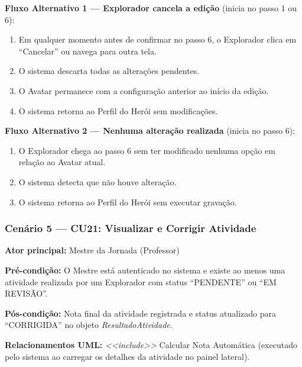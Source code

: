 \documentclass[12pt, a4paper]{article}
\begin{document}
\textbf{Fluxo Alternativo 1 --- Explorador cancela a edição} (inicia no passo 1 ou 6):
\begin{enumerate}
    \item Em qualquer momento antes de confirmar no passo 6, o Explorador clica em ``Cancelar'' ou navega para outra tela.
    \item O sistema descarta todas as alterações pendentes.
    \item O Avatar permanece com a configuração anterior ao início da edição.
    \item O sistema retorna ao Perfil do Herói sem modificações.
\end{enumerate}

\textbf{Fluxo Alternativo 2 --- Nenhuma alteração realizada} (inicia no passo 6):
\begin{enumerate}
    \item O Explorador chega ao passo 6 sem ter modificado nenhuma opção em relação ao Avatar atual.
    \item O sistema detecta que não houve alteração.
    \item O sistema retorna ao Perfil do Herói sem executar gravação.
\end{enumerate}

\bigskip

\subsubsection*{Cenário 5 --- CU21: Visualizar e Corrigir Atividade}

\noindent\textbf{Ator principal:} Mestre da Jornada (Professor)

\noindent\textbf{Pré-condição:} O Mestre está autenticado no sistema e existe ao menos
uma atividade realizada por um Explorador com status ``PENDENTE'' ou ``EM REVISÃO''.

\noindent\textbf{Pós-condição:} Nota final da atividade registrada e status atualizado
para ``CORRIGIDA'' no objeto \textit{ResultadoAtividade}.

\noindent\textbf{Relacionamentos UML:} \textit{<<include>>} Calcular Nota Automática
(executado pelo sistema ao carregar os detalhes da atividade no painel lateral).
\end{document}
